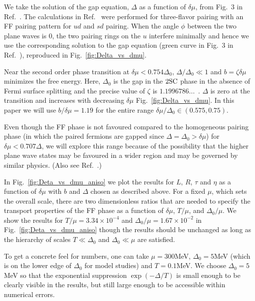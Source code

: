 \documentclass[10pt, aps, prd, superscriptaddress, nofootinbib, 
               amsmath, amssymb, twocolumn,
               preprintnumbers, showpacs,
               raggedbottom,
               floatfix]{revtex4-1}
\newcommand{\SC}{{\rm{SC}}}
\begin{document}
We take the solution of the gap equation, $\Delta$ as a function of
$\delta\mu$, from Fig.~$3$ in Ref.~\cite{Mannarelli:2006}.  The calculations in
Ref.~\cite{Mannarelli:2006} were performed for three-flavor pairing with an FF
pairing pattern for $ud$ and $sd$ pairing. When the angle $\phi$ between the
two plane waves is $0$, the two pairing rings on the $u$ interfere minimally
and hence we use the corresponding solution to the gap equation (green curve in
Fig.~$3$ in Ref.~\cite{Mannarelli:2006}), reproduced in
Fig.~\ref{fig:Delta_vs_dmu}.

Near the second order phase transition at $\delta\mu<0.754\Delta_{0}$, 
$\Delta/\Delta_{0}\ll1$ and $b=\zeta\delta\mu$
minimizes the free energy. Here, 
$\Delta_0$ is the gap in the $2\SC$ phase in the absence of Fermi surface
splitting and the precise value of $\zeta$ is
$1.1996786...$~\cite{larkin1964nonuniform,fulde1964superconductivity,
Bowers:2002xr,Bowers:2003ye,Mannarelli:2006}. $\Delta$ is zero at the transition and increases with
decreasing $\delta\mu$ Fig.~\ref{fig:Delta_vs_dmu}. In this paper we will use
$b/\delta\mu=1.19$ for the entire range $\delta\mu/\Delta_{0}\in(0.575,
0.75)$.  

Even though the FF phase is not favoured compared to the homogeneous
pairing phase (in which the paired fermions are gapped since
$\Delta=\Delta_0>\delta\mu$) for $\delta\mu<0.707\Delta$, we will explore this
range because of the possibility that the higher plane wave states may be
favoured in a wider region and may be governed by similar physics. (Also see
Ref.~\cite{Leibovich:2001xr}.) 

In Fig.~\ref{fig:Deta_vs_dmu_aniso} we plot the results for $L$, $R$, $\tau$
and $\eta$ as a function of $\delta\mu$ with $b$ and $\Delta$ chosen as
described above. For a fixed $\mu$, which sets the overall scale, there are two dimensionless ratios 
that are needed to specify the transport properties of the FF phase as a
function of $\delta\mu$, $T/\mu$, and $\Delta_0/\mu$. We show the results for 
$T/\mu=3.34\times10^{-4}$ and $\Delta_0/\mu=1.67\times10^{-2}$ in
Fig.~\ref{fig:Deta_vs_dmu_aniso} though the results should be unchanged as long as
the hierarchy of scales $T\ll\Delta_0$ and $\Delta_0\ll\mu$ are satisfied. 

To get a concrete feel for numbers, one can take $\mu=300$MeV, $\Delta_0=5$MeV
(which is on the lower edge of $\Delta_0$ for model studies) and $T=0.1$MeV. We
choose $\Delta_0=5$MeV so that the exponential suppression $\exp(-\Delta/T)$
is small enough to be clearly visible in the results, but still large enough to
be accessible within numerical errors.
\end{document}
